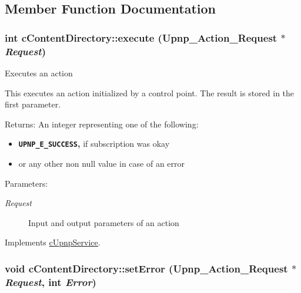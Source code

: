 \subsection{Member Function Documentation}
\hypertarget{classcContentDirectory_a0225df761512819b9c46f45b2a0f0d0}{
\subsubsection[{execute}]{\setlength{\rightskip}{0pt plus 5cm}int cContentDirectory::execute (Upnp\_\-Action\_\-Request $\ast$ {\em Request})}}
\label{classcContentDirectory_a0225df761512819b9c46f45b2a0f0d0}


Executes an action

This executes an action initialized by a control point. The result is stored in the first parameter.

\begin{Desc}
\item[Returns:]An integer representing one of the following:\begin{itemize}
\item {\bf {\tt UPNP\_\-E\_\-SUCCESS},} if subscription was okay\item or any other non null value in case of an error\end{itemize}
\end{Desc}
\begin{Desc}
\item[Parameters:]
\begin{description}
\item[{\em Request}]Input and output parameters of an action \end{description}
\end{Desc}
 

Implements \hyperlink{classcUpnpService_bbffca233e6aa193eda223cb7bfc2917}{cUpnpService}.\hypertarget{classcContentDirectory_a3b0df304987a0f2b17733c651d5b5c6}{
\subsubsection[{setError}]{\setlength{\rightskip}{0pt plus 5cm}void cContentDirectory::setError (Upnp\_\-Action\_\-Request $\ast$ {\em Request}, \/  int {\em Error})}}
\label{classcContentDirectory_a3b0df304987a0f2b17733c651d5b5c6}


